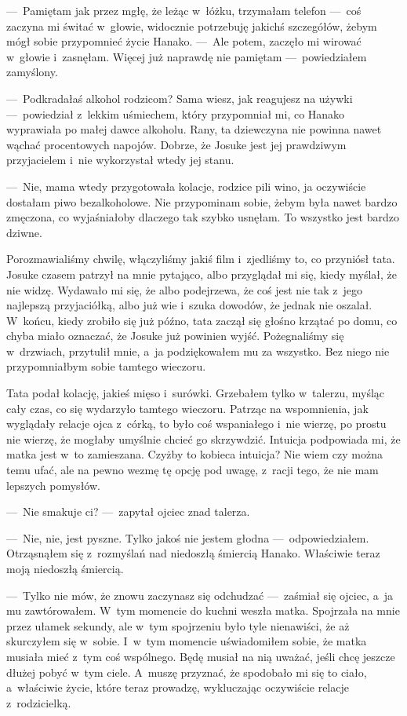 ---~Pamiętam jak przez mgłę, że leżąc w~łóżku, trzymałam telefon ---~coś zaczyna mi świtać w~głowie, widocznie potrzebuję jakichś szczegółów, żebym mógł sobie przypomnieć życie Hanako. ---~Ale potem, zaczęło mi wirować w~głowie i~zasnęłam. Więcej już naprawdę nie pamiętam ---~powiedziałem zamyślony. 

---~Podkradałaś alkohol rodzicom? Sama wiesz, jak reagujesz na używki ---~powiedział z~lekkim uśmiechem, który przypomniał mi, co Hanako wyprawiała po małej dawce alkoholu. Rany, ta dziewczyna nie powinna nawet wąchać procentowych napojów. Dobrze, że Josuke jest jej prawdziwym przyjacielem i~nie wykorzystał wtedy jej stanu.

---~Nie, mama wtedy przygotowała kolacje, rodzice pili wino, ja oczywiście dostałam piwo bezalkoholowe. Nie przypominam sobie, żebym była nawet bardzo zmęczona, co wyjaśniałoby dlaczego tak szybko usnęłam. To wszystko jest bardzo dziwne. 

Porozmawialiśmy chwilę, włączyliśmy jakiś film i~zjedliśmy to, co przyniósł tata. Josuke czasem patrzył na mnie pytająco, albo przyglądał mi się, kiedy myślał, że nie widzę. Wydawało mi się, że albo podejrzewa, że coś jest nie tak z~jego najlepszą przyjaciółką, albo już wie i~szuka dowodów, że jednak nie oszalał. W~końcu, kiedy zrobiło się już późno, tata zaczął się głośno krzątać po domu, co chyba miało oznaczać, że Josuke już powinien wyjść. Pożegnaliśmy się w~drzwiach, przytulił mnie, a~ja podziękowałem mu za wszystko. Bez niego nie przypomniałbym sobie tamtego wieczoru.

Tata podał kolację, jakieś mięso i~surówki. Grzebałem tylko w~talerzu, myśląc cały czas, co się wydarzyło tamtego wieczoru. Patrząc na wspomnienia, jak wyglądały relacje ojca z~córką, to było coś wspaniałego i~nie wierzę, po prostu nie wierzę, że mogłaby umyślnie chcieć go skrzywdzić. Intuicja podpowiada mi, że matka jest w~to zamieszana. Czyżby to kobieca intuicja? Nie wiem czy można temu ufać, ale na pewno wezmę tę opcję pod uwagę, z~racji tego, że nie mam lepszych pomysłów. 

---~Nie smakuje ci? ---~zapytał ojciec znad talerza. 

---~Nie, nie, jest pyszne. Tylko jakoś nie jestem głodna ---~odpowiedziałem. Otrząsnąłem się z~rozmyślań nad niedoszłą śmiercią Hanako. Właściwie teraz moją niedoszłą śmiercią. 

---~Tylko nie mów, że znowu zaczynasz się odchudzać ---~zaśmiał się ojciec, a~ja mu zawtórowałem. W~tym momencie do kuchni weszła matka. Spojrzała na mnie przez ułamek sekundy, ale w~tym spojrzeniu było tyle nienawiści, że aż skurczyłem się w~sobie. I~w~tym momencie uświadomiłem sobie, że matka musiała mieć z~tym coś wspólnego. Będę musiał na nią uważać, jeśli chcę jeszcze dłużej pobyć w~tym ciele. A~muszę przyznać, że spodobało mi się to ciało, a~właściwie życie, które teraz prowadzę, wykluczając oczywiście relacje z~rodzicielką. 

